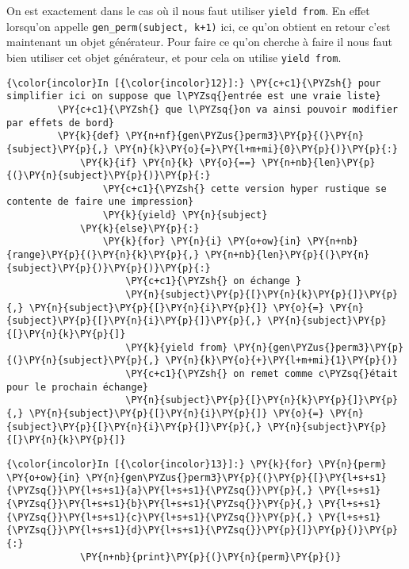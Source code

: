     On est exactement dans le cas où il nous faut utiliser
\texttt{yield\ from}. En effet lorsqu'on appelle
\texttt{gen\_perm(subject,\ k+1)} ici, ce qu'on obtient en retour c'est
maintenant un objet générateur. Pour faire ce qu'on cherche à faire il
nous faut bien utiliser cet objet générateur, et pour cela on utilise
\texttt{yield\ from}.

    \begin{Verbatim}[commandchars=\\\{\}]
{\color{incolor}In [{\color{incolor}12}]:} \PY{c+c1}{\PYZsh{} pour simplifier ici on suppose que l\PYZsq{}entrée est une vraie liste}
         \PY{c+c1}{\PYZsh{} que l\PYZsq{}on va ainsi pouvoir modifier par effets de bord}
         \PY{k}{def} \PY{n+nf}{gen\PYZus{}perm3}\PY{p}{(}\PY{n}{subject}\PY{p}{,} \PY{n}{k}\PY{o}{=}\PY{l+m+mi}{0}\PY{p}{)}\PY{p}{:}
             \PY{k}{if} \PY{n}{k} \PY{o}{==} \PY{n+nb}{len}\PY{p}{(}\PY{n}{subject}\PY{p}{)}\PY{p}{:}
                 \PY{c+c1}{\PYZsh{} cette version hyper rustique se contente de faire une impression}
                 \PY{k}{yield} \PY{n}{subject}
             \PY{k}{else}\PY{p}{:}
                 \PY{k}{for} \PY{n}{i} \PY{o+ow}{in} \PY{n+nb}{range}\PY{p}{(}\PY{n}{k}\PY{p}{,} \PY{n+nb}{len}\PY{p}{(}\PY{n}{subject}\PY{p}{)}\PY{p}{)}\PY{p}{:}
                     \PY{c+c1}{\PYZsh{} on échange }
                     \PY{n}{subject}\PY{p}{[}\PY{n}{k}\PY{p}{]}\PY{p}{,} \PY{n}{subject}\PY{p}{[}\PY{n}{i}\PY{p}{]} \PY{o}{=} \PY{n}{subject}\PY{p}{[}\PY{n}{i}\PY{p}{]}\PY{p}{,} \PY{n}{subject}\PY{p}{[}\PY{n}{k}\PY{p}{]}
                     \PY{k}{yield from} \PY{n}{gen\PYZus{}perm3}\PY{p}{(}\PY{n}{subject}\PY{p}{,} \PY{n}{k}\PY{o}{+}\PY{l+m+mi}{1}\PY{p}{)}
                     \PY{c+c1}{\PYZsh{} on remet comme c\PYZsq{}était pour le prochain échange}
                     \PY{n}{subject}\PY{p}{[}\PY{n}{k}\PY{p}{]}\PY{p}{,} \PY{n}{subject}\PY{p}{[}\PY{n}{i}\PY{p}{]} \PY{o}{=} \PY{n}{subject}\PY{p}{[}\PY{n}{i}\PY{p}{]}\PY{p}{,} \PY{n}{subject}\PY{p}{[}\PY{n}{k}\PY{p}{]}
\end{Verbatim}


    \begin{Verbatim}[commandchars=\\\{\}]
{\color{incolor}In [{\color{incolor}13}]:} \PY{k}{for} \PY{n}{perm} \PY{o+ow}{in} \PY{n}{gen\PYZus{}perm3}\PY{p}{(}\PY{p}{[}\PY{l+s+s1}{\PYZsq{}}\PY{l+s+s1}{a}\PY{l+s+s1}{\PYZsq{}}\PY{p}{,} \PY{l+s+s1}{\PYZsq{}}\PY{l+s+s1}{b}\PY{l+s+s1}{\PYZsq{}}\PY{p}{,} \PY{l+s+s1}{\PYZsq{}}\PY{l+s+s1}{c}\PY{l+s+s1}{\PYZsq{}}\PY{p}{,} \PY{l+s+s1}{\PYZsq{}}\PY{l+s+s1}{d}\PY{l+s+s1}{\PYZsq{}}\PY{p}{]}\PY{p}{)}\PY{p}{:}
             \PY{n+nb}{print}\PY{p}{(}\PY{n}{perm}\PY{p}{)}
\end{Verbatim}


